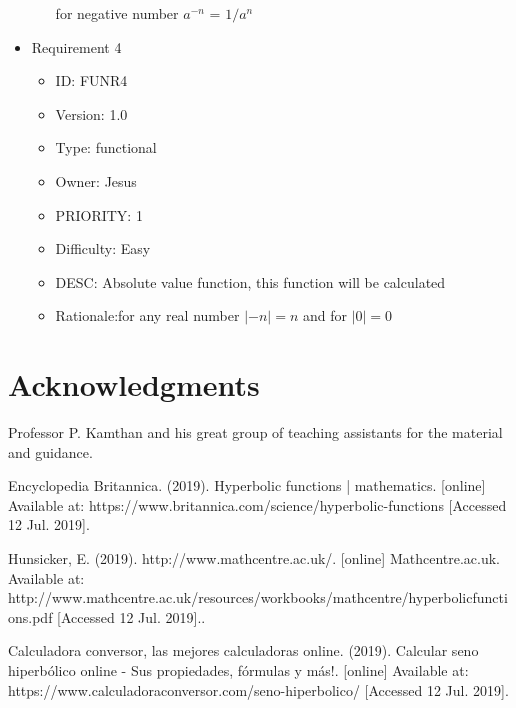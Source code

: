 \documentclass[12pt]{report}
\begin{document}
\begin{itemize}
\begin{itemize}
for negative number $a^{-n}$ = $1/a^{n}$
\end{itemize}
\item Requirement 4
\begin{itemize}
\item ID:       FUNR4
\item Version:  1.0
\item Type:     functional
\item Owner:    Jesus
\item PRIORITY: 1 
\item Difficulty: Easy
\item DESC: Absolute value function, this function will be calculated
\item Rationale:for any real number $|−n| = n$  and for $|0| = 0$
\end{itemize}
\end{itemize}
%

\newpage
\section{Acknowledgments}

 Professor P. Kamthan and his great group of teaching assistants for the material and guidance.
\newpage
 
\begin{thebibliography}{111}
   
Encyclopedia Britannica. (2019). Hyperbolic functions | mathematics. [online] Available at: https://www.britannica.com/science/hyperbolic-functions [Accessed 12 Jul. 2019].

{}
    Hunsicker, E. (2019). http://www.mathcentre.ac.uk/. [online] Mathcentre.ac.uk. Available at: http://www.mathcentre.ac.uk/resources/workbooks/mathcentre/hyperbolicfunctions.pdf [Accessed 12 Jul. 2019]..
  
   Calculadora conversor, las mejores calculadoras online. (2019). Calcular seno hiperbólico online - Sus propiedades, fórmulas y más!. [online] Available at: https://www.calculadoraconversor.com/seno-hiperbolico/ [Accessed 12 Jul. 2019].


\end{thebibliography}
\end{document}
